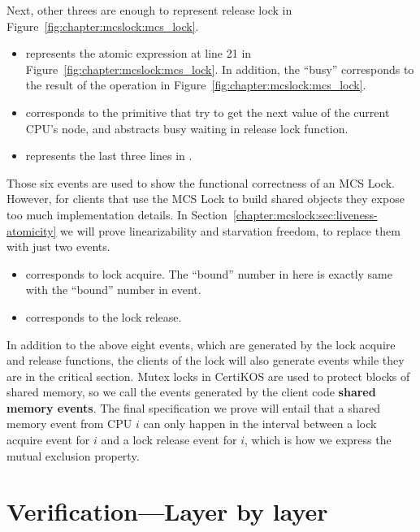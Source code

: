 Next, other threes are enough to represent release lock in Figure~\ref{fig:chapter:mcslock:mcs_lock}.

\begin{itemize}

\item \textbf{} represents the atomic expression at line 21  in Figure~\ref{fig:chapter:mcslock:mcs_lock}. 
In addition, the ``busy'' corresponds to the result of the  operation in Figure~\ref{fig:chapter:mcslock:mcs_lock}.

\item  \textbf{\getnext} corresponds to the primitive that try to get the next value of the current CPU's node, and abstracts busy waiting in release lock function.

\item  \textbf{\setbusy} represents the last three lines in .
\end{itemize}

Those six events are used to show the functional correctness of
an MCS Lock. However, for clients that use the MCS Lock to build shared
objects they expose too much implementation details.
In Section~\ref{chapter:mcslock:sec:liveness-atomicity} we will prove linearizability and
starvation freedom,  to replace them
with just two events.


\begin{itemize} 
\item \textbf{} corresponds to lock acquire. The ``bound'' number in here is exactly same with the ``bound'' number in  event.

\item \textbf{\rellock} corresponds to the lock release.
\end{itemize}

In addition to the above eight events, which are generated by the lock
acquire and release functions, the clients of the lock will also
generate events while they are in the critical section. Mutex locks in
CertiKOS are used to protect blocks of shared memory, so we call the
events generated by the client code \textbf{shared memory events}. The
final specification we prove will entail that a shared memory event
from CPU $i$ can only happen in the interval between a lock acquire
event for $i$ and a lock release event for $i$, which is how we
express the mutual exclusion property.

\section{Verification---Layer by layer}
\label{chapter:mcslock:sec:verification}%

